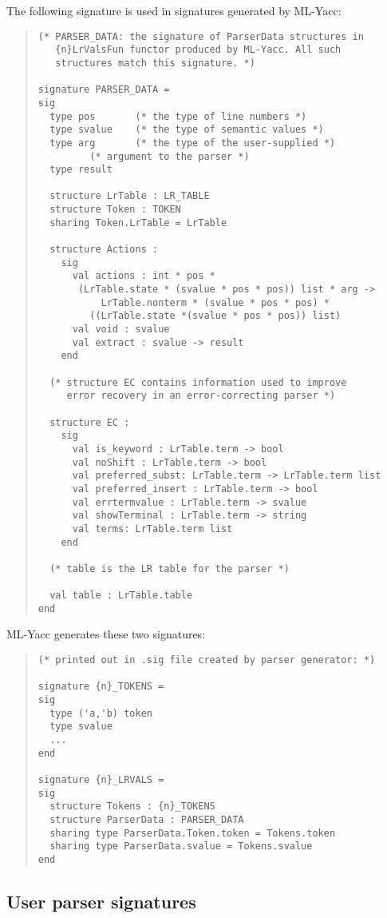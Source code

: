 The following signature is used in signatures generated by
ML-Yacc:
\begin{quote}
\begin{verbatim}
(* PARSER_DATA: the signature of ParserData structures in
   {n}LrValsFun functor produced by ML-Yacc. All such
   structures match this signature. *)

signature PARSER_DATA =
sig
  type pos       (* the type of line numbers *)
  type svalue    (* the type of semantic values *)
  type arg       (* the type of the user-supplied *)
		 (* argument to the parser *)
  type result

  structure LrTable : LR_TABLE
  structure Token : TOKEN
  sharing Token.LrTable = LrTable

  structure Actions : 
    sig
      val actions : int * pos *
       (LrTable.state * (svalue * pos * pos)) list * arg ->
	       LrTable.nonterm * (svalue * pos * pos) *
	     ((LrTable.state *(svalue * pos * pos)) list)
      val void : svalue
      val extract : svalue -> result
    end

  (* structure EC contains information used to improve
     error recovery in an error-correcting parser *)

  structure EC :
    sig
      val is_keyword : LrTable.term -> bool
      val noShift : LrTable.term -> bool
      val preferred_subst: LrTable.term -> LrTable.term list
      val preferred_insert : LrTable.term -> bool
      val errtermvalue : LrTable.term -> svalue
      val showTerminal : LrTable.term -> string
      val terms: LrTable.term list
    end

  (* table is the LR table for the parser *)

  val table : LrTable.table
end
\end{verbatim}
\end{quote}

ML-Yacc generates these two signatures:
\begin{quote}
\begin{verbatim}
(* printed out in .sig file created by parser generator: *)

signature {n}_TOKENS = 
sig
  type ('a,'b) token
  type svalue
  ...
end

signature {n}_LRVALS =
sig
  structure Tokens : {n}_TOKENS
  structure ParserData : PARSER_DATA
  sharing type ParserData.Token.token = Tokens.token
  sharing type ParserData.svalue = Tokens.svalue
end
\end{verbatim}
\end{quote}
\subsection{User parser signatures}

